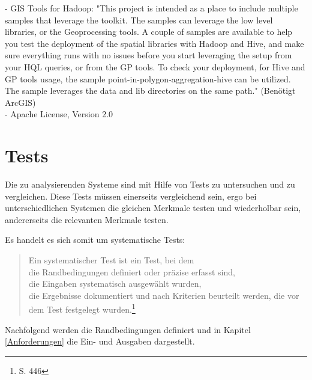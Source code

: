 - GIS Tools for Hadoop: "This project is intended as a place to include multiple samples that leverage the toolkit. The samples can leverage the low level libraries, or the Geoprocessing tools. A couple of samples are available to help you test the deployment of the spatial libraries with Hadoop and Hive, and make sure everything runs with no issues before you start leveraging the setup from your HQL queries, or from the GP tools. To check your deployment, for Hive and GP tools usage, the sample point-in-polygon-aggregation-hive can be utilized. The sample leverages the data and lib directories on the same path."\cite{website:esri-hadoop2} (Benötigt ArcGIS)\\
- Apache License, Version 2.0

\section{Tests}

Die zu analysierenden Systeme sind mit Hilfe von Tests zu untersuchen und zu vergleichen.
Diese Tests müssen einerseits vergleichend sein, ergo bei unterschiedlichen Systemen die gleichen Merkmale testen und wiederholbar sein, andererseits die relevanten Merkmale testen.

Es handelt es sich somit um systematische Tests:
\begin {quote}
Ein systematischer Test ist ein Test, bei dem\\
die Randbedingungen definiert oder präzise erfasst sind,\\
die Eingaben systematisch ausgewählt wurden,\\
die Ergebnisse dokumentiert und nach Kriterien beurteilt werden, die vor dem Test festgelegt wurden.\footnote{\cite{book:softwareengineering} S. 446}
\end{quote}

Nachfolgend werden die Randbedingungen definiert und in Kapitel \ref{Anforderungen} die Ein- und Ausgaben dargestellt.


